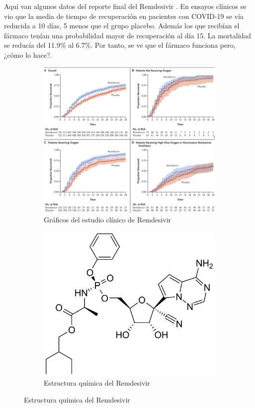 \documentclass[a4paper,11pt]{report}
\begin{document}
 Aquí van algunos datos del reporte final del Remdesivir \cite{remde}. En ensayos clínicos se vio que la media de tiempo de recuperación en pacientes con COVID-19 se vía reducida a 10 días, 5 menos que el grupo placebo. Además los que recibían el fármaco tenían una probabilidad mayor de recuperación al día 15. La mortalidad se reducía del 11.9\% al 6.7\%. Por tanto, se ve que el fármaco funciona pero, ¿cómo lo hace?.
 
 \begin{figure}[h]
 	\centering
 	\begin{subfigure}{0.75\textwidth}
 		\includegraphics[width=\linewidth]{Figuras/Figura10}
 		\caption{Gráficos del estudio clínico de Remdesivir \cite{remde} }
 	\end{subfigure}   
    \begin{subfigure}{0.35\textwidth}
    \includegraphics[width=\linewidth]{Figuras/Figura11}
    \caption{Estructura química del Remdesivir}
    \label{fig: remde}
    \end{subfigure}
 	
 	
 \end{figure}
 
\end{document}
